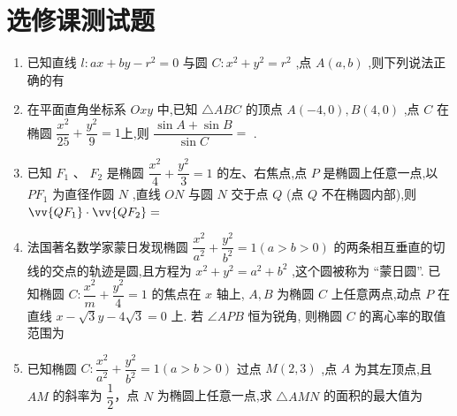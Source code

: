 \section*{选修课测试题}
\begin{enumerate}
    \item 已知直线 $l : {ax} + {by} - {r}^{2} = 0$ 与圆 $C : {x}^{2} + {y}^{2} = {r}^{2}$ ,点 $A\left( {a,b}\right)$ ,则下列说法正确的有
    \item 在平面直角坐标系 ${Oxy}$ 中,已知 $\bigtriangleup  {ABC}$ 的顶点 $A\left( {-4,0}\right) ,B\left( {4,0}\right)$ ,点 $C$ 在椭圆 $\dfrac{{x}^{2}}{25} + \dfrac{{y}^{2}}{9} = 1$上,则 $\dfrac{\sin A + \sin B}{\sin C} =$ .
    
    \item 已知 ${F}_{1}$ 、 ${F}_{2}$ 是椭圆 $\dfrac{{x}^{2}}{4} + \dfrac{{y}^{2}}{3} = 1$ 的左、右焦点,点 $P$ 是椭圆上任意一点,以 $P{F}_{1}$ 为直径作圆 $N$ ,直线 ${ON}$ 与圆 $N$ 交于点 $Q$ (点 $Q$ 不在椭圆内部),则 $\vv{Q{F}_{1}} \cdot  \vv{Q{F}_{2}} =$ 
    
    \item 法国著名数学家蒙日发现椭圆 $\dfrac{{x}^{2}}{{a}^{2}} + \dfrac{{y}^{2}}{{b}^{2}} = 1\left( {a > b > 0}\right)$ 的两条相互垂直的切线的交点的轨迹是圆,且方程为 ${x}^{2} + {y}^{2} = {a}^{2} + {b}^{2}$ ,这个圆被称为 “蒙日圆”. 已知椭圆 $C : \dfrac{{x}^{2}}{m} + \dfrac{{y}^{2}}{4} = 1$ 的焦点在 $x$ 轴上, $A,B$ 为椭圆 $C$ 上任意两点,动点 $P$ 在直线 $x - \sqrt{3}y - 4\sqrt{3} = 0$ 上. 若 $\angle {APB}$ 恒为锐角, 则椭圆 $C$ 的离心率的取值范围为
    \item 已知椭圆 $C : \dfrac{{x}^{2}}{{a}^{2}} + \dfrac{{y}^{2}}{{b}^{2}} = 1\left( {a > b > 0}\right)$ 过点 $M\left( {2,3}\right)$ ,点 $A$ 为其左顶点,且 ${AM}$ 的斜率为 $\dfrac{1}{2}$，点 $N$ 为椭圆上任意一点,求 $\bigtriangleup  {AMN}$ 的面积的最大值为
    

\end{enumerate}
